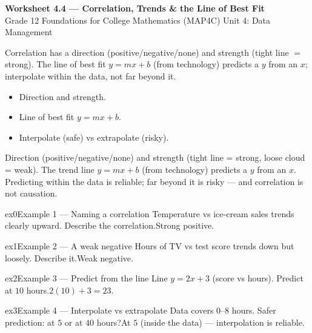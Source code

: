\documentclass[11pt]{article}
\begin{document}
\begin{center}
{\LARGE\bfseries\color{titleblue}Worksheet 4.4 --- Correlation, Trends \& the Line of Best Fit}\\[2pt]
{\small Grade 12 Foundations for College Mathematics (MAP4C) \textperiodcentered{} Unit 4: Data Management}
\end{center}

\begin{ideabox}
Correlation has a direction (positive/negative/none) and strength (tight line $=$ strong). The line of best fit $y=mx+b$ (from technology) predicts a $y$ from an $x$; interpolate within the data, not far beyond it.
\begin{itemize}[leftmargin=*,itemsep=2pt]
  \item Direction and strength.
  \item Line of best fit $y=mx+b$.
  \item Interpolate (safe) vs extrapolate (risky).
\end{itemize}
\end{ideabox}

\begin{learnbox}
Direction (positive/negative/none) and strength (tight line = strong, loose cloud = weak).
The trend line $y=mx+b$ (from technology) predicts a $y$ from an $x$.
Predicting within the data is reliable; far beyond it is risky — and correlation is not causation.
\end{learnbox}


\begin{example}{ex0}{Example 1 --- Naming a correlation}
Temperature vs ice-cream sales trends clearly upward. Describe the correlation.\soln Strong positive.
\end{example}

\begin{example}{ex1}{Example 2 --- A weak negative}
Hours of TV vs test score trends down but loosely. Describe it.\soln Weak negative.
\end{example}

\begin{example}{ex2}{Example 3 --- Predict from the line}
Line $y=2x+3$ (score vs hours). Predict at $10$ hours.\soln $2(10)+3=23$.
\end{example}

\begin{example}{ex3}{Example 4 --- Interpolate vs extrapolate}
Data covers $0$–$8$ hours. Safer prediction: at $5$ or at $40$ hours?\soln At $5$ (inside the data) — interpolation is reliable.
\end{example}
\end{document}
